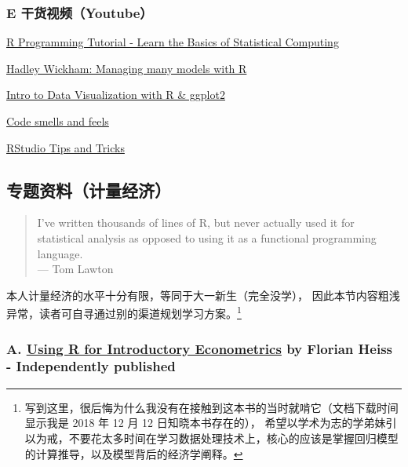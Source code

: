 \documentclass[11pt,hyperref]{ctexart}
\begin{document}
\hypertarget{e-ux5e72ux8d27ux89c6ux9891youtube}{%
\subsubsection{E
干货视频（Youtube）}\label{e-ux5e72ux8d27ux89c6ux9891youtube}}

\href{https://www.youtube.com/watch?v=_V8eKsto3Ug\&t=6s}{R Programming
Tutorial - Learn the Basics of Statistical Computing}

\href{https://www.youtube.com/watch?v=rz3_FDVt9eg\&t=3221s}{Hadley
Wickham: Managing many models with R}

\href{https://www.youtube.com/watch?v=49fADBfcDD4\&t=3498s}{Intro to
Data Visualization with R \& ggplot2}

\href{https://www.youtube.com/watch?v=7oyiPBjLAWY}{Code smells and
feels}

\href{https://www.youtube.com/watch?v=kuSQgswZdr8}{RStudio Tips and
Tricks}

\hypertarget{ux4e13ux9898ux8d44ux6599ux8ba1ux91cfux7ecfux6d4e}{%
\subsection{专题资料（计量经济）}\label{ux4e13ux9898ux8d44ux6599ux8ba1ux91cfux7ecfux6d4e}}

\begin{quote}
I've written thousands of lines of R, but never actually used it for
statistical analysis as opposed to using it as a functional programming
language.\\
--- Tom Lawton
\end{quote}

本人计量经济的水平十分有限，等同于大一新生（完全没学），
因此本节内容粗浅异常，读者可自寻通过别的渠道规划学习方案。\footnote{写到这里，很后悔为什么我没有在接触到这本书的当时就啃它（文档下载时间显示我是
  2018 年 12 月 12 日知晓本书存在的），
  希望以学术为志的学弟妹引以为戒，不要花太多时间在学习数据处理技术上，核心的应该是掌握回归模型的计算推导，以及模型背后的经济学阐释。}

\hypertarget{a.-using-r-for-introductory-econometrics-by-florian-heiss---independently-published}{%
\subsubsection{\texorpdfstring{A. \href{http://www.urfie.net/}{Using R
for Introductory Econometrics} by Florian Heiss - Independently
published}{A. Using R for Introductory Econometrics by Florian Heiss - Independently published}}\label{a.-using-r-for-introductory-econometrics-by-florian-heiss---independently-published}}
\end{document}
